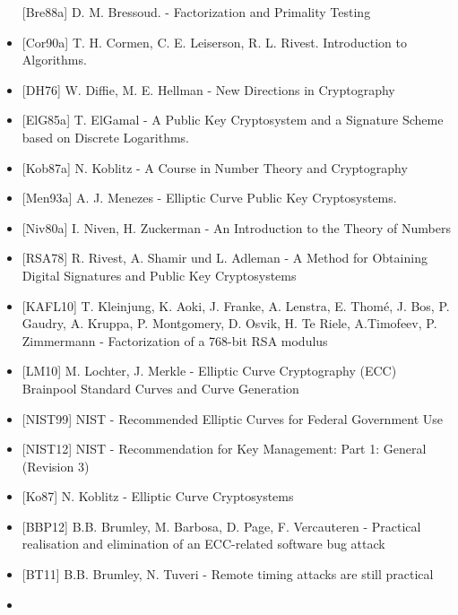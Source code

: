 \documentclass[a4paper]{article}
\begin{document}
\begin{multicols}{3}
\begin{itemize}
              {[}Bre88a{]} D. M. Bressoud. - Factorization and Primality Testing
        \item
              {[}Cor90a{]} T. H. Cormen, C. E. Leiserson, R. L. Rivest. Introduction
              to Algorithms.
        \item
              {[}DH76{]} W. Diffie, M. E. Hellman - New Directions in Cryptography
        \item
              {[}ElG85a{]} T. ElGamal - A Public Key Cryptosystem and a Signature
              Scheme based on Discrete Logarithms.
        \item
              {[}Kob87a{]} N. Koblitz - A Course in Number Theory and Cryptography
        \item
              {[}Men93a{]} A. J. Menezes - Elliptic Curve Public Key Cryptosystems.
        \item
              {[}Niv80a{]} I. Niven, H. Zuckerman - An Introduction to the Theory of
              Numbers
        \item
              {[}RSA78{]} R. Rivest, A. Shamir und L. Adleman - A Method for
              Obtaining Digital Signatures and Public Key Cryptosystems
        \item
              {[}KAFL10{]} T. Kleinjung, K. Aoki, J. Franke, A. Lenstra, E. Thomé,
              J. Bos, P. Gaudry, A. Kruppa, P. Montgomery, D. Osvik, H. Te Riele,
              A.Timofeev, P. Zimmermann - Factorization of a 768-bit RSA modulus
        \item
              {[}LM10{]} M. Lochter, J. Merkle - Elliptic Curve Cryptography (ECC)
              Brainpool Standard Curves and Curve Generation
        \item
              {[}NIST99{]} NIST - Recommended Elliptic Curves for Federal Government
              Use
        \item
              {[}NIST12{]} NIST - Recommendation for Key Management: Part 1: General
              (Revision 3)
        \item
              {[}Ko87{]} N. Koblitz - Elliptic Curve Cryptosystems
        \item
              {[}BBP12{]} B.B. Brumley, M. Barbosa, D. Page, F. Vercauteren -
              Practical realisation and elimination of an ECC-related software bug
              attack
        \item
              {[}BT11{]} B.B. Brumley, N. Tuveri - Remote timing attacks are still
              practical
        \item

\end{itemize}
\end{multicols}
\end{document}
